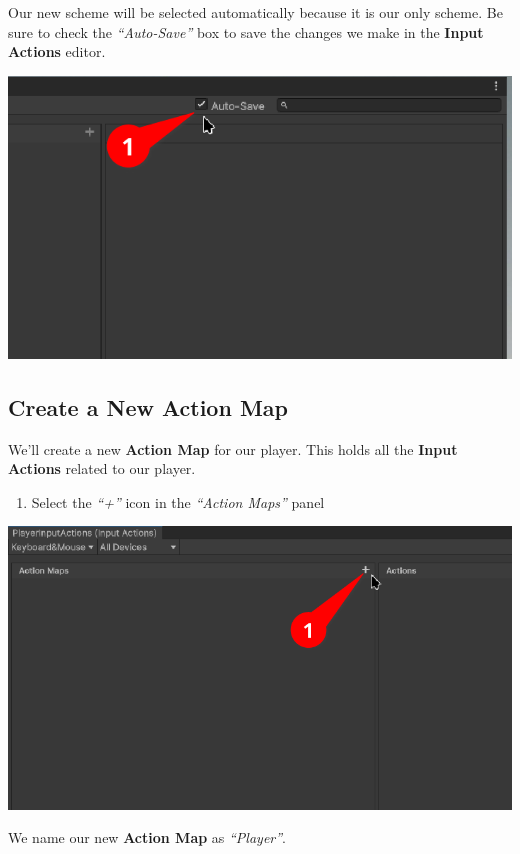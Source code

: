 \documentclass[a4paper,11pt,twoside]{article}
\begin{document}
Our new scheme will be selected automatically because it is our only scheme. Be sure to check the \emph{``Auto-Save''} box to save the changes we make in the \textbf{Input Actions} editor.
\begin{center}
\includegraphics[width=.9\linewidth]{./SnapShots/Auto-Save.png}
\end{center}
\subsection*{Create a New Action Map}
\label{sec:orgb350d20}
We'll create a new \textbf{Action Map} for our player. This holds all the \textbf{Input Actions} related to our player.
\begin{enumerate}
\item Select the \emph{``+''} icon in the \emph{``Action Maps''} panel
\end{enumerate}
\begin{center}
\includegraphics[width=.9\linewidth]{./SnapShots/AddMap.png}
\end{center}
We name our new \textbf{Action Map} as \emph{``Player''}.
\end{document}
